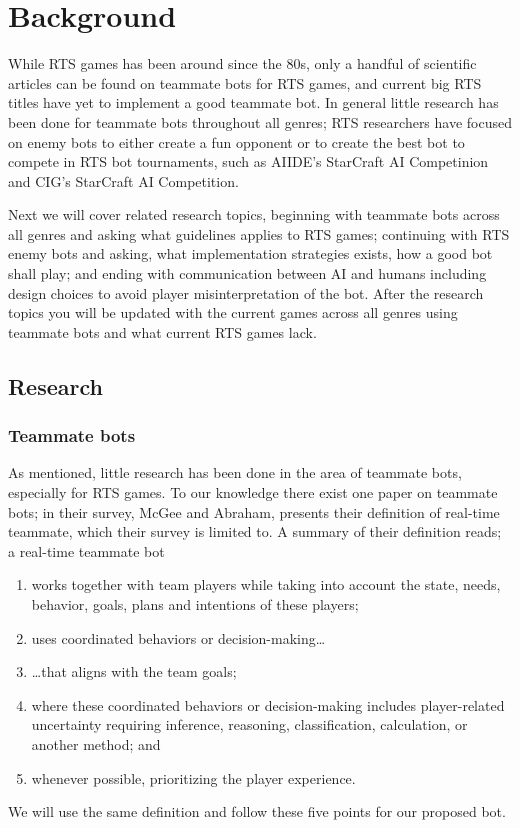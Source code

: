 \chapter{Background}
While RTS games has been around since the 80s\cite{adams06, rtsHistory}, only a handful of scientific articles can be found on teammate bots for RTS games, and current big RTS titles have yet to implement a good teammate bot. In general little research has been done for teammate bots throughout all genres; RTS researchers have focused on enemy bots to either create a fun opponent
or to create the best bot to compete in RTS bot tournaments, such as  AIIDE's StarCraft AI Competinion\cite{scaiide} and CIG's StarCraft AI Competition\cite{sccig}.

Next we will cover related research topics, beginning with teammate bots across all genres and asking what guidelines applies to RTS games; continuing with RTS enemy bots and asking, what implementation strategies exists, how a good bot shall play; and ending with communication between AI and humans including design choices to avoid player misinterpretation of the bot. After the research topics you will be updated with the current games across all genres using teammate bots and what current RTS games lack.

\section{Research}
\subsection{Teammate bots}
As mentioned, little research has been done in the area of teammate bots, especially for RTS games. To our knowledge there exist one paper on teammate bots\cite{mcgee10}; in their survey, McGee and Abraham, presents their definition of real-time teammate, which their survey is limited to. A summary of their definition reads; a real-time teammate bot
\begin{enumerate}
	\item works together with team players while taking into account the state, needs, behavior, goals, plans and intentions of these players;
	\item uses coordinated behaviors or decision-making\ldots
	\item {\ldots}that aligns with the team goals;
	\item where these coordinated behaviors or decision-making includes player-related uncertainty requiring inference, reasoning, classification, calculation, or another method; and
	\item whenever possible, prioritizing the player experience.
\end{enumerate}
We will use the same definition and follow these five points for our proposed bot.

